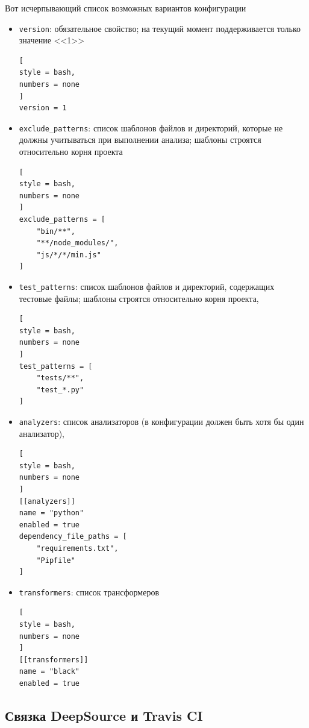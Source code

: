 \documentclass[%
	11pt,
	a4paper,
	utf8,
		]{article}
\begin{document}
Вот исчерпывающий список возможных вариантов конфигурации
\begin{itemize}
	\item \texttt{version}: обязательное свойство; на текущий момент поддерживается только значение <<1>>
\begin{lstlisting}[
style = bash,
numbers = none	
]
version = 1
\end{lstlisting}
	
	\item \texttt{exclude\_patterns}: список шаблонов файлов и директорий, которые не должны учитываться при выполнении анализа; шаблоны строятся относительно корня проекта
\begin{lstlisting}[
style = bash,
numbers = none
]
exclude_patterns = [
    "bin/**",
    "**/node_modules/",
    "js/*/*/min.js"
]
\end{lstlisting}
	
	\item \texttt{test\_patterns}: список шаблонов файлов и директорий, содержащих тестовые файлы; шаблоны строятся относительно корня проекта,
\begin{lstlisting}[
style = bash,
numbers = none	
]
test_patterns = [
    "tests/**",
    "test_*.py"
]
\end{lstlisting}
	
	\item \texttt{analyzers}: список анализаторов (в конфигурации должен быть хотя бы один анализатор),
\begin{lstlisting}[
style = bash,
numbers = none	
]
[[analyzers]]
name = "python"
enabled = true
dependency_file_paths = [
    "requirements.txt",
    "Pipfile"
]
\end{lstlisting}
	
	\item \texttt{transformers}: список трансформеров
\begin{lstlisting}[
style = bash,
numbers = none	
]
[[transformers]]
name = "black"
enabled = true
\end{lstlisting}
\end{itemize}

\subsection{Связка DeepSource и Travis CI}
\end{document}
